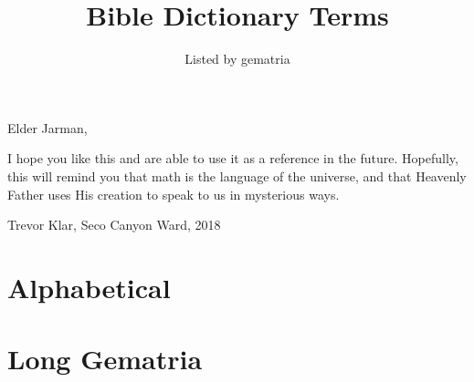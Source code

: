 \documentclass[8pt, twoside]{extarticle}
\title{Bible Dictionary Terms}
\author{Listed by gematria}
\date{}
\begin{document}
\maketitle

\noindent Elder Jarman,

I hope you like this and are able to use it as a reference in the future. Hopefully, this will remind you that math is the language of the universe, and that Heavenly Father uses His creation to speak to us in mysterious ways.

Trevor Klar, Seco Canyon Ward, 2018
\section*{Alphabetical}



\begin{multicols}{2}

\end{multicols}


\section*{Long Gematria}

\begin{multicols}{2}

\end{multicols}
\end{document}
